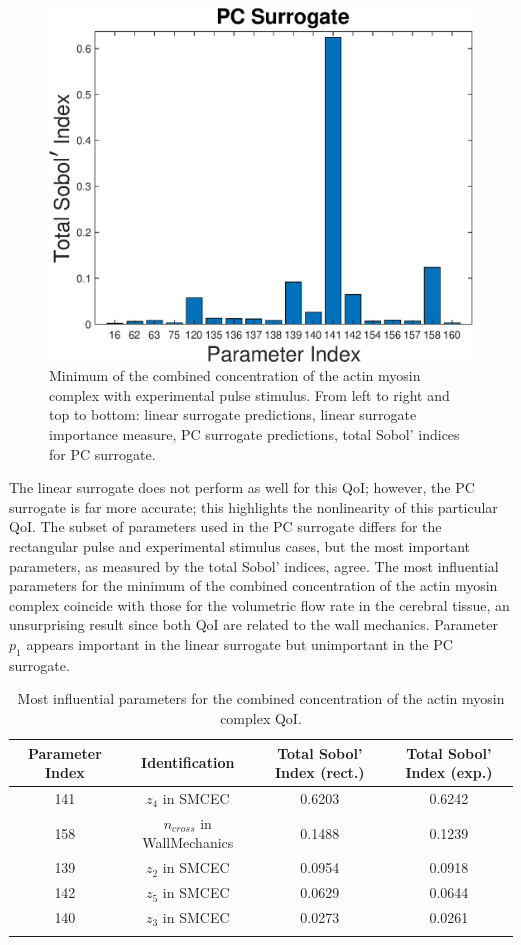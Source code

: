 \begin{figure}[h]
\hspace{.1 cm}
\includegraphics[width=.475 \textwidth]{Figures/AM_AMp_Min_QoI_PCE_SI_Experimental.eps}
\caption{Minimum of the combined concentration of the actin myosin complex with experimental pulse stimulus. From left to right and top to bottom: linear surrogate predictions, linear surrogate importance measure, PC surrogate predictions, total Sobol' indices for PC surrogate.}
\label{fig:qoi_AM_AMp_Min_exp}
\end{figure}

The linear surrogate does not perform as well for this QoI; however, the PC surrogate is far more accurate; this highlights the nonlinearity of this particular QoI. The subset of parameters used in the PC surrogate differs for the rectangular pulse and experimental stimulus cases, but the most important parameters, as measured by the total Sobol' indices, agree. The most influential parameters for the minimum of the combined concentration of the actin myosin complex coincide with those for the volumetric flow rate in the cerebral tissue, an unsurprising result since both QoI are related to the wall mechanics. Parameter $p_1$ appears important in the linear surrogate but unimportant in the PC surrogate.

\begin{table}[h]
\centering
{}
\begin{tabular}{cccc}
\toprule
Parameter Index & Identification & Total Sobol' Index (rect.) & Total Sobol' Index (exp.)\\
\midrule
141 & $z_4$ in SMCEC & 0.6203 & 0.6242\\
158 & $n_{cross}$ in WallMechanics & 0.1488 &0.1239\\
139 &  $z_2$ in SMCEC & 0.0954 &0.0918\\
142 & $z_5$ in SMCEC & 0.0629 & 0.0644\\
140 & $z_3$ in SMCEC & 0.0273 &0.0261\\
 \arrayrulecolor{black}\bottomrule
\end{tabular}
\caption{Most influential parameters for the combined concentration of the actin myosin complex QoI.}
\label{tab:qoi_AM_AMp_Min}
\end{table}

